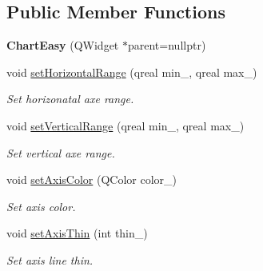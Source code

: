 \subsection*{Public Member Functions}
\begin{DoxyCompactItemize}
\item 
\mbox{\label{classeven_1_1_chart_easy_a9651b6fb51341d8a05f7187842817082}} 
{\bfseries Chart\+Easy} (Q\+Widget $\ast$parent=nullptr)
\item 
\mbox{\label{classeven_1_1_chart_easy_a1fab7c68d37b05a7d086f08ec0ac4dfd}} 
void \mbox{\hyperlink{classeven_1_1_chart_easy_a1fab7c68d37b05a7d086f08ec0ac4dfd}{set\+Horizontal\+Range}} (qreal min\+\_\+, qreal max\+\_\+)
\begin{DoxyCompactList}\small\item\em Set horizonatal axe range. \end{DoxyCompactList}\item 
\mbox{\label{classeven_1_1_chart_easy_a54d53944afd0944a873182f85dada06f}} 
void \mbox{\hyperlink{classeven_1_1_chart_easy_a54d53944afd0944a873182f85dada06f}{set\+Vertical\+Range}} (qreal min\+\_\+, qreal max\+\_\+)
\begin{DoxyCompactList}\small\item\em Set vertical axe range. \end{DoxyCompactList}\item 
\mbox{\label{classeven_1_1_chart_easy_a01777bc10b346e8d5e9c894d32a90c54}} 
void \mbox{\hyperlink{classeven_1_1_chart_easy_a01777bc10b346e8d5e9c894d32a90c54}{set\+Axis\+Color}} (Q\+Color color\+\_\+)
\begin{DoxyCompactList}\small\item\em Set axis color. \end{DoxyCompactList}\item 
\mbox{\label{classeven_1_1_chart_easy_ad272186c61986c30b700d28530f602f2}} 
void \mbox{\hyperlink{classeven_1_1_chart_easy_ad272186c61986c30b700d28530f602f2}{set\+Axis\+Thin}} (int thin\+\_\+)
\begin{DoxyCompactList}\small\item\em Set axis line thin. \end{DoxyCompactList}\item 

\end{DoxyCompactItemize}
